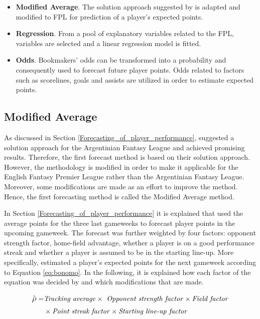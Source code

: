 \begin{itemize}
    \item \textbf{Modified Average}. The solution approach suggested by \cite{Bonomo} is adapted and modified to FPL for prediction of a player's expected points.
    \item \textbf{Regression}. From a pool of explanatory variables related to the FPL, variables are selected and a linear regression model is fitted. 
    \item \textbf{Odds}. Bookmakers' odds can be transformed into a probability and consequently used to forecast future player points. Odds related to factors such as scorelines, goals and assists are utilized in order to estimate expected points. 
\end{itemize}


\subsection{Modified Average} \label{Sol_approach_Modified_Average}

As discussed in Section \ref{Forecasting_of_player_performance}, \cite{Bonomo} suggested a solution approach for the Argentinian Fantasy League and achieved promising results. Therefore, the first forecast method is based on their solution approach. However, the methodology is modified in order to make it applicable for the English Fantasy Premier League rather than the Argentinian Fantasy League. Moreover, some modifications are made as an effort to improve the method. Hence, the first forecasting method is called the Modified Average method.

\newpar

In Section \ref{Forecasting_of_player_performance} it is explained that  \cite{Bonomo} used the average points for the three last gameweeks to forecast player points in the upcoming gameweek. The forecast was further weighted by four factors: opponent strength factor, home-field advantage, whether a player is on a good performance streak and whether a player is assumed to be in the starting line-up. More specifically, \cite{Bonomo} estimated a player's expected points for the next gameweek according to Equation \ref{eq:bonomo}. In the following, it is explained how each factor of the equation was decided by \cite{Bonomo} and which modifications that are made.

\begin{equation}
\begin{split}
    \hat{\rho}  = & \textrm{\textit{Tracking average}} \times \textrm{\textit{ Opponent strength factor}} \times \textrm{\textit{Field factor}} \\
        & \times \textrm{\textit{Point streak factor}} \times \textrm{\textit{Starting line-up factor}}
\end{split}
\label{eq:bonomo}
\end{equation}


